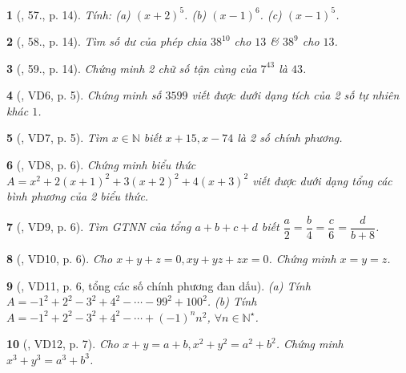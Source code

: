 \documentclass{article}
\newtheorem{baitoan}{}
\begin{document}
\begin{baitoan}[\cite{Tuyen_Toan_8}, 57., p. 14]
	Tính: (a) $(x + 2)^5$. (b) $(x - 1)^6$. (c) $(x - 1)^5$.
\end{baitoan}

\begin{baitoan}[\cite{Tuyen_Toan_8}, 58., p. 14]
	Tìm số dư của phép chia $38^{10}$ cho $13$ \& $38^9$ cho $13$.
\end{baitoan}

\begin{baitoan}[\cite{Tuyen_Toan_8}, 59., p. 14]
	Chứng minh 2 chữ số tận cùng của $7^{43}$ là $43$.
\end{baitoan}

\begin{baitoan}[\cite{Binh_Toan_8_tap_1}, VD6, p. 5]
	Chứng minh số $3599$ viết được dưới dạng tích của 2 số tự nhiên khác $1$.
\end{baitoan}

\begin{baitoan}[\cite{Binh_Toan_8_tap_1}, VD7, p. 5]
	Tìm $x\in\mathbb{N}$ biết $x + 15,x - 74$ là 2 số chính phương.
\end{baitoan}

\begin{baitoan}[\cite{Binh_Toan_8_tap_1}, VD8, p. 6]
	Chứng minh biểu thức $A = x^2 + 2(x + 1)^2 + 3(x + 2)^2 + 4(x + 3)^2$ viết được dưới dạng tổng các bình phương của 2 biểu thức.
\end{baitoan}

\begin{baitoan}[\cite{Binh_Toan_8_tap_1}, VD9, p. 6]
	Tìm {\rm GTNN} của tổng $a + b + c + d$ biết $\dfrac{a}{2} = \dfrac{b}{4} = \dfrac{c}{6} = \dfrac{d}{b + 8}$.
\end{baitoan}

\begin{baitoan}[\cite{Binh_Toan_8_tap_1}, VD10, p. 6]
	Cho $x + y + z = 0,xy + yz + zx = 0$. Chứng minh $x = y = z$.
\end{baitoan}

\begin{baitoan}[\cite{Binh_Toan_8_tap_1}, VD11, p. 6, tổng các số chính phương đan dấu]
	(a) Tính $A = -1^2 + 2^2 - 3^2 + 4^2 - \cdots - 99^2 + 100^2$. (b) Tính $A = -1^2 + 2^2 - 3^2 + 4^2 - \cdots + (-1)^nn^2$, $\forall n\in\mathbb{N}^\star$.
\end{baitoan}

\begin{baitoan}[\cite{Binh_Toan_8_tap_1}, VD12, p. 7]
	Cho $x + y = a + b,x^2 + y^2 = a^2 + b^2$. Chứng minh $x^3 + y^3 = a^3 + b^3$.
\end{baitoan}
\end{document}
